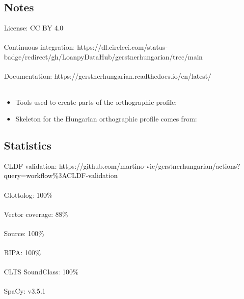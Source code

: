 \documentclass[letterpaper,10pt,english]{sphinxmanual}
\begin{document}
\subsection{Notes}
\label{\detokenize{home:notes}}
\sphinxAtStartPar
License: CC BY 4.0\\\\
 Continuous integration: https://dl.circleci.com/status-badge/redirect/gh/LoanpyDataHub/gerstnerhungarian/tree/main\\\\
 Documentation: https://gerstnerhungarian.readthedocs.io/en/latest/\\\\

\begin{itemize}
\item {} 
\sphinxAtStartPar
Tools used to create parts of the orthographic profile:

\item {} 
\sphinxAtStartPar
Skeleton for the Hungarian orthographic profile comes from:

\end{itemize}


\subsection{Statistics}
\label{\detokenize{home:statistics}}
\sphinxAtStartPar
CLDF validation: https://github.com/martino-vic/gerstnerhungarian/actions?query=workflow\%3ACLDF-validation\\\\
 Glottolog: 100\%\\\\
 Vector coverage: 88\%\\\\
 Source: 100\%\\\\
BIPA: 100\%\\\\
 CLTS SoundClass: 100\%\\\\
SpaCy: v3.5.1\\\\
\end{document}
